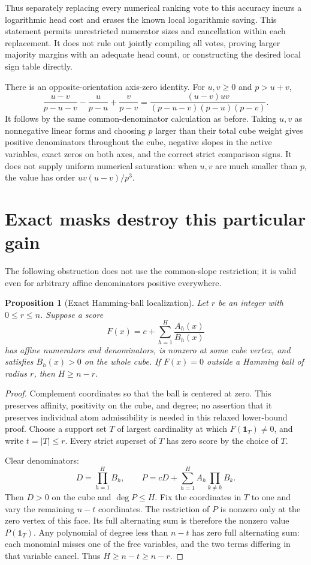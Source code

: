 \documentclass[11pt]{article}
\newtheorem{proposition}{Proposition}
\begin{document}
Thus separately replacing every numerical ranking vote to this
accuracy incurs a logarithmic head cost and erases the known local
logarithmic saving. This statement permits unrestricted numerator
sizes and cancellation within each replacement. It does not rule
out jointly compiling all votes, proving larger majority margins
with an adequate head count, or constructing the desired local
sign table directly.

There is an opposite-orientation axis-zero identity. For $u,v\geq0$
and $p>u+v$,
\[
 \frac{u-v}{p-u-v}-\frac{u}{p-u}+\frac{v}{p-v}
 =\frac{(u-v)uv}{(p-u-v)(p-u)(p-v)}.
\]
It follows by the same common-denominator calculation as before.
Taking $u,v$ as nonnegative linear forms and choosing $p$ larger
than their total cube weight gives positive denominators throughout
the cube, negative slopes in the active variables, exact zeros
on both axes, and the correct strict comparison signs. It does
not supply uniform numerical saturation: when $u,v$ are much
smaller than $p$, the value has order $uv(u-v)/p^3$.

\section{Exact masks destroy this particular gain}

The following obstruction does not use the common-slope restriction;
it is valid even for arbitrary affine denominators positive everywhere.

\begin{proposition}[Exact Hamming-ball localization]
Let $r$ be an integer with $0\leq r\leq n$. Suppose a score
\[
 F(x)=c+\sum_{h=1}^H\frac{A_h(x)}{B_h(x)}
\]
has affine numerators and denominators, is nonzero at some cube
vertex, and satisfies $B_h(x)>0$ on the whole cube. If $F(x)=0$
outside a Hamming ball of radius $r$, then
$H\geq n-r$.
\end{proposition}
\begin{proof}
Complement coordinates so that the ball is centered at zero. This
preserves affinity, positivity on the cube, and degree; no assertion
that it preserves individual atom admissibility is needed in this
relaxed lower-bound proof. Choose a support set $T$ of largest
cardinality at which $F(\mathbf1_T)\ne0$, and write $t=|T|\leq r$.
Every strict superset of $T$ has zero score by the choice of $T$.

Clear denominators:
\[
 D=\prod_{h=1}^H B_h,\qquad
 P=cD+\sum_{h=1}^H A_h\prod_{k\ne h}B_k.
\]
Then $D>0$ on the cube and $\deg P\leq H$.
Fix the coordinates in $T$ to one and vary the remaining $n-t$
coordinates. The restriction of $P$ is nonzero only at the zero
vertex of this face. Its full alternating sum is therefore the
nonzero value $P(\mathbf1_T)$. Any polynomial of degree less than
$n-t$ has zero full alternating sum: each monomial misses one of
the free variables, and the two terms differing in that variable
cancel. Thus $H\geq n-t\geq n-r$.
\end{proof}
\end{document}
